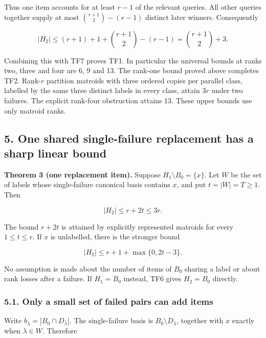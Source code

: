 Thus one item accounts for at least \(r-1\) of the relevant queries. All other queries together supply at most \(\binom{r+1}{2}-(r-1)\) distinct later winners. Consequently

\[
|H_2|\le(r+1)+1+\binom{r+1}{2}-(r-1)
=\binom{r+1}{2}+3.
\]

Combining this with TF7 proves TF1. In particular the universal bounds at ranks two, three and four are 6, 9 and 13. The rank-one bound proved above completes TF2. Rank-\(r\) partition matroids with three ordered copies per parallel class, labelled by the same three distinct labels in every class, attain \(3r\) under two failures. The explicit rank-four obstruction attains 13. These upper bounds use only matroid ranks.

\hypertarget{af-0a3ce40617-one-shared-single-failure-replacement-has-a-sharp-linear-bound}{%
\subsection{5. One shared single-failure replacement has a sharp linear bound}\label{af-0a3ce40617-one-shared-single-failure-replacement-has-a-sharp-linear-bound}}

\textbf{Theorem 3 (one replacement item).} Suppose \(H_1\setminus B_0=\{x\}\). Let \(W\) be the set of labels whose single-failure canonical basis contains \(x\), and put \(t=|W|=T\ge1\). Then

\[
\boxed{|H_2|\le r+2t\le3r.}
\tag{TF12}
\]

The bound \(r+2t\) is attained by explicitly represented matroids for every \(1\le t\le r\). If \(x\) is unlabelled, there is the stronger bound

\[
|H_2|\le r+1+\max\{0,2t-3\}.
\]

No assumption is made about the number of items of \(B_0\) sharing a label or about rank losses after a failure. If \(H_1=B_0\) instead, TF6 gives \(H_2=B_0\) directly.

\hypertarget{af-0a3ce40617-only-a-small-set-of-failed-pairs-can-add-items}{%
\subsubsection{5.1. Only a small set of failed pairs can add items}\label{af-0a3ce40617-only-a-small-set-of-failed-pairs-can-add-items}}

Write \(b_\lambda=|B_0\cap D_\lambda|\). The single-failure basis is \(B_0\setminus D_\lambda\), together with \(x\) exactly when \(\lambda\in W\). Therefore

